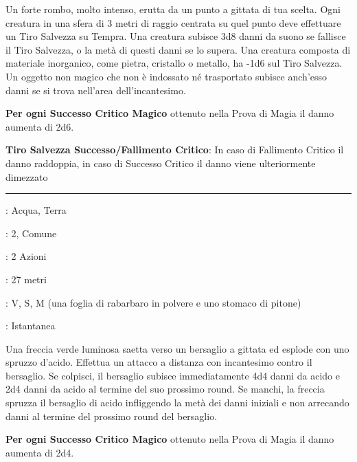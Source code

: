 \begin{multicols}{2}
Un forte rombo, molto intenso, erutta da un punto a gittata di tua scelta. Ogni creatura in una sfera di 3 metri di raggio centrata su quel punto deve effettuare un Tiro Salvezza su Tempra. Una creatura subisce 3d8 danni da suono se fallisce il Tiro Salvezza, o la metà di questi danni se lo supera. Una creatura composta di materiale inorganico, come pietra, cristallo o metallo, ha -1d6 sul Tiro Salvezza. Un oggetto non magico che non è indossato né trasportato subisce anch'esso danni se si trova nell'area dell'incantesimo.

\textbf{Per ogni Successo Critico Magico} ottenuto nella Prova di Magia il danno aumenta di 2d6.

\textbf{Tiro Salvezza Successo/Fallimento Critico}: In caso di Fallimento Critico il danno raddoppia, in caso di Successo Critico il danno viene ulteriormente dimezzato

\smallskip\noindent\rule{\linewidth}{2pt} \hypertarget{Freccia Acida di Restser}{}\smallskip{}
\noindent
\begin{description}[noitemsep, topsep=0pt, parsep=0pt, partopsep=0pt, leftmargin=0cm, labelwidth=2.8cm]
	\item[\textbf{Lista di Magia}]: Acqua, Terra
	\item[\textbf{Livello}]: 2, Comune
	\item[\textbf{T. di Lancio}]: 2 Azioni
	\item[\textbf{Gittata}]: 27 metri
	\item[\textbf{Componenti}]: V, S, M (una foglia di rabarbaro in polvere e uno stomaco di pitone)
	\item[\textbf{Durata}]: Istantanea
\end{description}

Una freccia verde luminosa saetta verso un bersaglio a gittata ed esplode con uno spruzzo d'acido. Effettua un attacco a distanza con incantesimo contro il bersaglio. Se colpisci, il bersaglio subisce immediatamente 4d4 danni da acido e 2d4 danni da acido al termine del suo prossimo round. Se manchi, la freccia spruzza il bersaglio di acido infliggendo la metà dei danni iniziali e non arrecando danni al termine del prossimo round del bersaglio.

\textbf{Per ogni Successo Critico Magico} ottenuto nella Prova di Magia il danno aumenta di 2d4.


\end{multicols}
